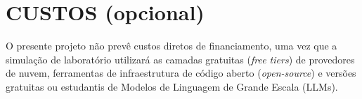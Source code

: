 \section{CUSTOS (opcional)}

O presente projeto não prevê custos diretos de financiamento, uma vez que a simulação de laboratório utilizará as camadas gratuitas (\textit{free tiers}) de provedores de nuvem, ferramentas de infraestrutura de código aberto (\textit{open-source}) e versões gratuitas ou estudantis de Modelos de Linguagem de Grande Escala (LLMs).
